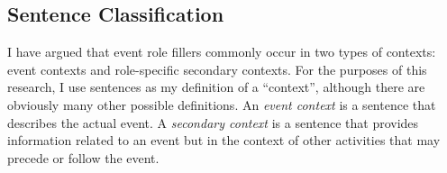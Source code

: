 \subsection{Sentence Classification}
\label{ssec:role-specific}

I have argued that event role fillers commonly occur in two types of
contexts: event contexts and role-specific secondary contexts.  For
the purposes of this research, I use sentences as my definition of a
``context'', although there are obviously many other possible
definitions. 
An {\it event context} is a
sentence that describes the actual event. A {\it
secondary context} is a sentence that provides information related to
an event but in the context of other activities that may precede or
follow the event. 

